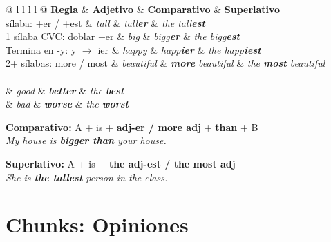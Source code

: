 \documentclass[12pt,a4paper]{article}
\begin{document}
\begin{cajagrammar}
\begin{tabularx}{\textwidth}{@{} l l l l @{}}
\toprule
\textbf{Regla} & \textbf{Adjetivo} & \textbf{Comparativo} & \textbf{Superlativo} \\
 sílaba: +er / +est & \textit{tall} & \textit{tall\textbf{er}} & \textit{the tall\textbf{est}} \\
1 sílaba CVC: doblar +er & \textit{big} & \textit{bigg\textbf{er}} & \textit{the bigg\textbf{est}} \\
Termina en -y: y $\rightarrow$ ier & \textit{happy} & \textit{happ\textbf{ier}} & \textit{the happ\textbf{iest}} \\
2+ sílabas: more / most & \textit{beautiful} & \textit{\textbf{more} beautiful} & \textit{the \textbf{most} beautiful} \\
\midrule
{} \\
& \textit{good} & \textit{\textbf{better}} & \textit{the \textbf{best}} \\
& \textit{bad} & \textit{\textbf{worse}} & \textit{the \textbf{worst}} \\
\bottomrule
\end{tabularx}

\medskip
\begin{cajaejemplo}
\textbf{Comparativo:} A + is + \textbf{adj-er / more adj} + \textbf{than} + B\\
\textit{My house is \textbf{bigger than} your house.}

\medskip
\textbf{Superlativo:} A + is + \textbf{the adj-est / the most adj}\\
\textit{She is \textbf{the tallest} person in the class.}
\end{cajaejemplo}
\end{cajagrammar}

\section{Chunks: Opiniones}
\end{document}
